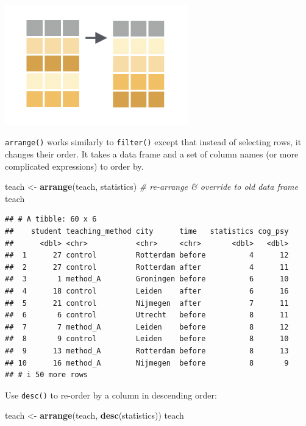 \documentclass[
]{scrartcl}
\newenvironment{Shaded}{\begin{snugshade}}{\end{snugshade}}
\newcommand{\CommentTok}[1]{\textcolor[rgb]{0.56,0.35,0.01}{\textit{#1}}}
\newcommand{\FunctionTok}[1]{\textcolor[rgb]{0.13,0.29,0.53}{\textbf{#1}}}
\newcommand{\NormalTok}[1]{#1}
\newcommand{\OtherTok}[1]{\textcolor[rgb]{0.56,0.35,0.01}{#1}}
\begin{document}
\begin{center}\includegraphics[width=300px]{images/dplyr-arrange} \end{center}

\texttt{arrange()} works similarly to \texttt{filter()} except that instead of selecting rows, it changes their order. It takes a data frame and a set of column names (or more complicated expressions) to order by.

\begin{Shaded}
\begin{Highlighting}[]
\NormalTok{teach }\OtherTok{\textless{}{-}} \FunctionTok{arrange}\NormalTok{(teach, statistics)   }\CommentTok{\# re{-}arrange \& override to old data frame}
\NormalTok{teach}
\end{Highlighting}
\end{Shaded}

\begin{verbatim}
## # A tibble: 60 x 6
##    student teaching_method city      time   statistics cog_psy
##      <dbl> <chr>           <chr>     <chr>       <dbl>   <dbl>
##  1      27 control         Rotterdam before          4      12
##  2      27 control         Rotterdam after           4      11
##  3       1 method_A        Groningen before          6      10
##  4      18 control         Leiden    after           6      16
##  5      21 control         Nijmegen  after           7      11
##  6       6 control         Utrecht   before          8      11
##  7       7 method_A        Leiden    before          8      12
##  8       9 control         Leiden    before          8      10
##  9      13 method_A        Rotterdam before          8      13
## 10      16 method_A        Nijmegen  before          8       9
## # i 50 more rows
\end{verbatim}

Use \texttt{desc()} to re-order by a column in descending order:

\begin{Shaded}
\begin{Highlighting}[]
\NormalTok{teach }\OtherTok{\textless{}{-}} \FunctionTok{arrange}\NormalTok{(teach, }\FunctionTok{desc}\NormalTok{(statistics))}
\NormalTok{teach}
\end{Highlighting}
\end{Shaded}
\end{document}
